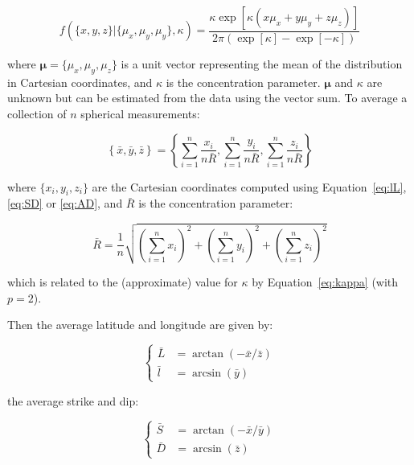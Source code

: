 \begin{equation}
  f(\{x,y,z\}|\{\mu_x,\mu_y,\mu_y\},\kappa) = \frac{\kappa\exp[\kappa
      (x\mu_x+y\mu_y+z\mu_z)]}{2\pi(\exp[\kappa]-\exp[-\kappa])}
  \label{eq:vonMisesFisher}
\end{equation}

\noindent where $\mathbf{\mu}=\{\mu_x,\mu_y,\mu_z\}$ is a unit vector
representing the mean of the distribution in Cartesian coordinates,
and $\kappa$ is the concentration parameter. $\mathbf{\mu}$ and
$\kappa$ are unknown but can be estimated from the data using the
vector sum. To average a collection of $n$ spherical measurements:

\begin{equation}
  \left\{\bar{x},\bar{y},\bar{z}\right\} =
  \left\{\sum_{i=1}^{n}\frac{x_i}{n\bar{R}},
  \sum_{i=1}^{n}\frac{y_i}{n\bar{R}},
  \sum_{i=1}^{n}\frac{z_i}{n\bar{R}}
  \right\}
\end{equation}

\noindent where $\{x_i,y_i,z_i\}$ are the Cartesian coordinates
computed using Equation~\ref{eq:lL}, \ref{eq:SD} or \ref{eq:AD},
and $\bar{R}$ is the concentration parameter:

\begin{equation}
  \bar{R} = \frac{1}{n}
    \sqrt{\left(\sum_{i=1}^{n}x_i\right)^2 +
      \left(\sum_{i=1}^{n}y_i\right)^2 +
      \left(\sum_{i=1}^{n}z_i\right)^2
    }
\end{equation}

\noindent which is related to the (approximate) value for $\kappa$ by
Equation~\ref{eq:kappa} (with $p=2$).

Then the average latitude and longitude are given by:

\begin{equation}
  \left\{
  \begin{split}
  \bar{L} & = \arctan\left(-\bar{x}/\bar{z}\right)\\
  \bar{l} & = \arcsin\left(\bar{y}\right)
  \end{split}
  \right.
\end{equation}

\noindent the average strike and dip:

\begin{equation}
  \left\{
  \begin{split}
    \bar{S} & = \arctan\left(-\bar{x}/\bar{y}\right)\\
    \bar{D} & = \arcsin\left(\bar{z}\right)
  \end{split}
  \right.
\end{equation}

